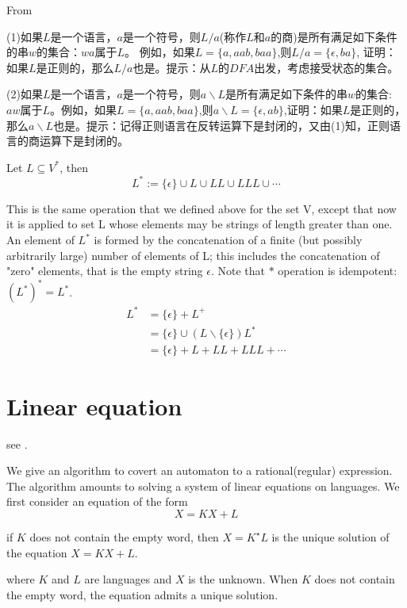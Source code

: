 \clearpage

From \cite[p99]{Hopcroft2008}

(1)如果$L$是一个语言，$a$是一个符号，则$L/a$(称作$L$和$a$的商)是所有满足如下条件的串$w$的集合：$wa$属于$L$。
例如，如果$L=\{a,aab,baa\}$,则$L/a = \{\epsilon,ba\}$, 证明：如果$L$是正则的，那么$L/a$也是。提示：从$L$的$DFA$出发，考虑接受状态的集合。

(2)如果$L$是一个语言，$a$是一个符号，则$a\backslash L$是所有满足如下条件的串$w$的集合: $aw$属于$L$。例如，如果$L=\{a,aab,baa\}$,则$a\backslash L=\{\epsilon,ab\}$,证明：如果$L$是正则的，那么$a\backslash L$也是。提示：记得正则语言在反转运算下是封闭的，又由(1)知，正则语言的商运算下是封闭的。

\begin{definition}
	Let $L\subseteq V^{\ast}$, then 
	$$L^{\ast} := \{\epsilon\}\cup L \cup LL\cup LLL\cup \cdots$$ 
\end{definition}

This is the same operation that we defined above for the set V, except that now it is applied to set L whose elements may be strings of length greater than one. An element of $L^*$ is formed by the concatenation of a finite (but possibly arbitrarily large) number of elements of L; this includes the concatenation of "zero" elements, that is the empty string $\epsilon$. Note that $\ast$ operation is idempotent: ${(L^*)}^* = L^*$.
\begin{align*}
L^{\ast} &= \{\epsilon\} +L^{+} \\
&=  \{\epsilon\}\cup (L\backslash \{\epsilon\})L^{\ast}\\ &=\{\epsilon\} + L + LL + LLL + \cdots 
\end{align*}

\section{Linear equation}

see \cite[5.3,p64]{Jean2018}.

We give an algorithm to covert an automaton to a rational(regular) expression. The algorithm amounts to solving a system of linear equations on languages. We first consider an equation of the form
\begin{equation}\label{Linear equation}
X = KX + L
\end{equation}

\begin{proposition}
	if $K$ does not contain the empty word, then $X = K^\star L$ is the unique solution of the equation $X = KX + L$.
\end{proposition}
where $K$ and $L$ are languages and $X$ is the unknown. When $K$ does not contain the empty word, the equation admits a unique solution.

